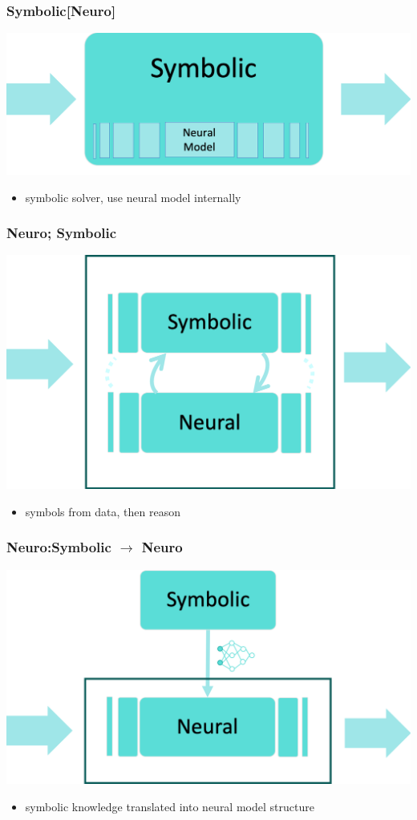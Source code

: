 \documentclass{beamer}
\begin{document}
\begin{frame}
  \frametitle{Symbolic[Neuro]}
  \centering
  \includegraphics[width=.7\textwidth]{ns11.png}
  \begin{itemize}
  \item symbolic solver, use neural model internally
  \end{itemize}
\end{frame}

\begin{frame}
  \frametitle{Neuro; Symbolic}
  \centering
  \includegraphics[width=.7\textwidth]{ns12.png}
  \begin{itemize}
  \item symbols from data, then reason
  \end{itemize}
\end{frame}

\begin{frame}
  \frametitle{Neuro:Symbolic $\rightarrow$ Neuro}
  \centering
  \includegraphics[width=.7\textwidth]{ns13.png}
  \begin{itemize}
  \item symbolic knowledge translated into neural model structure
  \end{itemize}
\end{frame}
\end{document}
